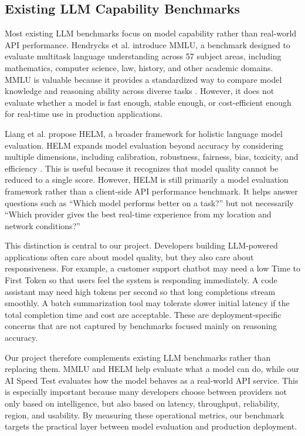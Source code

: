 \documentclass[11pt, a4paper]{article}
\begin{document}
\subsection{Existing LLM Capability Benchmarks}

Most existing LLM benchmarks focus on model capability rather than real-world API performance. Hendrycks et al. introduce MMLU, a benchmark designed to evaluate multitask language understanding across 57 subject areas, including mathematics, computer science, law, history, and other academic domains. MMLU is valuable because it provides a standardized way to compare model knowledge and reasoning ability across diverse tasks \cite{mmlu}. However, it does not evaluate whether a model is fast enough, stable enough, or cost-efficient enough for real-time use in production applications.

Liang et al. propose HELM, a broader framework for holistic language model evaluation. HELM expands model evaluation beyond accuracy by considering multiple dimensions, including calibration, robustness, fairness, bias, toxicity, and efficiency \cite{helm}. This is useful because it recognizes that model quality cannot be reduced to a single score. However, HELM is still primarily a model evaluation framework rather than a client-side API performance benchmark. It helps answer questions such as ``Which model performs better on a task?'' but not necessarily ``Which provider gives the best real-time experience from my location and network conditions?''

This distinction is central to our project. Developers building LLM-powered applications often care about model quality, but they also care about responsiveness. For example, a customer support chatbot may need a low Time to First Token so that users feel the system is responding immediately. A code assistant may need high tokens per second so that long completions stream smoothly. A batch summarization tool may tolerate slower initial latency if the total completion time and cost are acceptable. These are deployment-specific concerns that are not captured by benchmarks focused mainly on reasoning accuracy.

Our project therefore complements existing LLM benchmarks rather than replacing them. MMLU and HELM help evaluate what a model can do, while our AI Speed Test evaluates how the model behaves as a real-world API service. This is especially important because many developers choose between providers not only based on intelligence, but also based on latency, throughput, reliability, region, and usability. By measuring these operational metrics, our benchmark targets the practical layer between model evaluation and production deployment.
\end{document}
